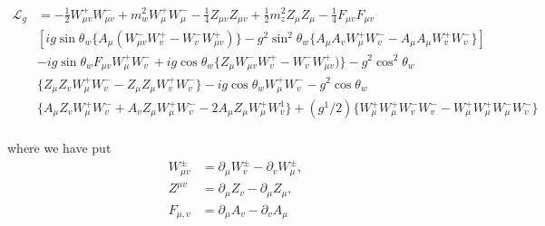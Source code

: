 {\fontsize{8}{10}\selectfont
\begin{align*}
\mathcal{L}_{g} &= -\frac{1}{2}W^{+}_{\mu v}W^{-}_{\mu v} + m^{2}_{w}W^{+}_{\mu} W^{-}_{\mu} - \frac{1}{4}Z_{\mu v}Z_{\mu  v} + \frac{1}{2}m^{2}_{z}Z_{\mu} Z_{\mu} - \frac{1}{4}F_{\mu v} F_{\mu v}\\
& [ig \sin \theta_{w}\{A_{\mu}(W^{-}_{\mu v} W^{+}_{v} - W^{-}_{v}W^{+}_{\mu v}) \} - g^{2} \sin^{2} \theta_{w} \{A_{\mu}A_{v} W^{+}_{\mu}W^{-}_{v} - A_{\mu} A_{\mu} W^{+}_{v}W^{-}_{v}\}]\\
&-ig \sin \theta_{w} F_{\mu v}W^{+}_{\mu}W^{-}_{v} + ig \cos \theta_{w}\{Z_{\mu} W^{-}_{\mu v} W^{+}_{v} - W^{-}_{v}W^{+}_{\mu v})\} -g^{2} \cos^{2}\theta_{w}\\
&\{Z_{\mu} Z_{v} W^{+}_{\mu}W^{-}_{v} - Z_{\mu} Z_{\mu} W^{+}_{v} W^{-}_{v}\} - ig \cos \theta_{w}W^{+}_{\mu} W^{-}_{v} - g^{2} \cos \theta_{w}\\
& \{A_{\mu} Z_{v} W^{+}_{\mu} W^{-}_{v} + A_{v} Z_{\mu} W^{+}_{\mu} W^{-}_{v} -2A_{\mu}Z_{\mu}W^{+}_{\mu} W^{1}_{v}\} + (g^{1}/2) \{W^{+}_{\mu} W^{+}_{\mu} W^{-}_{v}W^{-}_{v}-W^{+}_{\mu} W^{+}_{\mu}W^{-}_{\mu}W^{-}_{v}\}\tag{4.15}\\
\end{align*}}

where we have put
\begin{align*}
W^{\pm}_{\mu v} & = \partial_{\mu}W^{\pm}_{v}-\partial_{v}W^{\pm}_{\mu},\tag{4.16}\\
Z^{\mu v} &= \partial_{\mu}Z_{v}-\partial_{\mu} Z_{\mu},\tag{4.17}\\
F_{\mu, v} & = \partial_{\mu}A_{v}-\partial_{v}A_{\mu}\tag{4.18} 
\end{align*}

